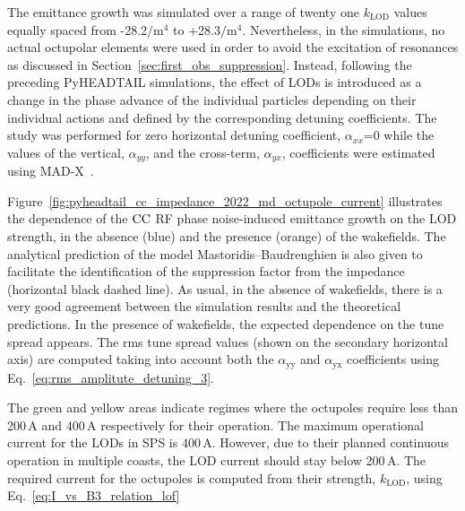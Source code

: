 The emittance growth was simulated over a range of twenty one $k_\mathrm{LOD}$ values equally spaced from -28.2$\mathrm{/m^4}$ to +28.3$\mathrm{/m^4}$. Nevertheless, in the simulations, no actual octupolar elements were used in order to avoid the excitation of resonances as discussed in Section~\ref{sec:first_obs_suppression}. Instead, following the preceding PyHEADTAIL simulations, the effect of LODs is introduced as a change in the phase advance of the individual particles depending on their individual actions and defined by the corresponding detuning coefficients. The study was performed for zero horizontal detuning coefficient, $\alpha_{xx}$=0 while the values of the vertical, $\alpha_{yy}$, and the cross-term, $\alpha_{yx}$, coefficients were estimated using MAD-X~\cite{madx}.

Figure~\ref{fig:pyheadtail_cc_impedance_2022_md_octupole_current} illustrates the dependence of the ${\mathrm{CC}}$ RF phase noise-induced emittance growth on the LOD strength, in the absence (blue) and the presence (orange) of the wakefields. The analytical prediction of the model Mastoridis--Baudrenghien is also given to facilitate the identification of the suppression factor from the impedance (horizontal black dashed line). As usual, in the absence of wakefields, there is a very good agreement between the simulation results and the theoretical predictions. In the presence of wakefields, the expected dependence on the tune spread appears. The rms tune spread values (shown on the secondary horizontal axis) are computed taking into account both the $\alpha_{\mathrm{yy}}$ and $\alpha_{\mathrm{yx}}$ coefficients using Eq.~\eqref{eq:rms_amplitute_detuning_3}.

The green and yellow areas indicate regimes where the octupoles require less than 200\,A and 400\,A respectively for their operation. The maximum operational current for the LODs in SPS is 400\,A. However, due to their planned continuous operation in multiple coasts, the LOD current should stay below 200\,A. The required current for the octupoles is computed from their strength, $k_\mathrm{LOD}$, using Eq.~\eqref{eq:I_vs_B3_relation_lof}


